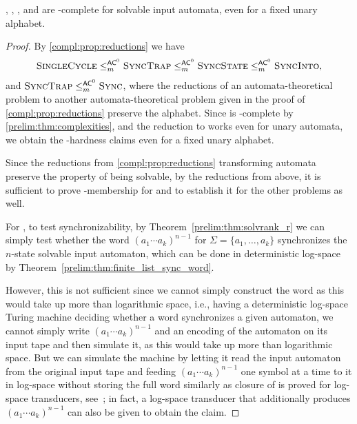 \begin{theorem} \label{thm:SYNC-solv}
\DFAST, \DFASS, \DFAS, and \SIS are \LOGSPACE-complete for solvable input automata, even for a fixed unary alphabet.
\end{theorem}
\begin{proof}
	By \cref{compl:prop:reductions} we have
	\[
	\text{\sc Single\-Cycle} \le_m^{\textup{\textsf{AC}}^0} \textsc{\sc Sync\-Trap} \le_m^{\textup{\textsf{AC}}^0}  \text{\sc Sync\-State} \le_m^{\textup{\textsf{AC}}^0} \textsc{\sc Sync\-Into},
	\]
	and $\textsc{\sc Sync\-Trap} \le_m^{\textup{\textsf{AC}}^0} \text{\sc Sync}$,
	where the reductions of an automata-theoretical problem to another automata-theoretical problem given in the proof
	of \cref{compl:prop:reductions} preserve the alphabet.
	Since \SCP is \LOGSPACE-complete by \cref{prelim:thm:complexities},
	and the reduction to \DFAST 
	works even for unary automata, we obtain the \LOGSPACE-hardness claims even for a fixed unary alphabet.
	
	
	Since the reductions from \cref{compl:prop:reductions} transforming automata preserve
	the property of being solvable, 
	by the reductions from above, it is sufficient to prove \LOGSPACE-membership
	for \DFAS and \SIS to establish it for the other problems as well.
	
	For \DFAS, to test synchronizability, by Theorem~\ref{prelim:thm:solvrank_r} 
	we can simply test whether the word $(a_1 \cdots a_k)^{n-1}$ for $\Sigma = \{a_1, \ldots, a_k\}$
	synchronizes the $n$-state solvable input automaton, which can be done in deterministic log-space
	by Theorem~\ref{prelim:thm:finite_list_sync_word}.
	
	However, this is not sufficient since we cannot simply construct the word
	as this would take up more than logarithmic space, i.e.,
	having a deterministic log-space Turing machine 
	deciding whether a word synchronizes a given automaton,
	we cannot simply write $(a_1 \cdots a_k)^{n-1}$ and an encoding of the automaton 
	on its input tape and then simulate it, as this would
	take up more than logarithmic space.
	But we can simulate the machine by letting it read the input automaton
	from the original input tape
	and feeding
	$(a_1 \cdots a_k)^{n-1}$ one symbol at a time to it in log-space without storing the full word similarly as closure of \LOGSPACE
	is proved for log-space transducers, see~\cite[Lem.~13.2]{HopUll79}; in fact,
	a log-space transducer that additionally produces 
	$(a_1 \cdots a_k)^{n-1}$ can also be given to obtain the claim.
		

\end{proof}
